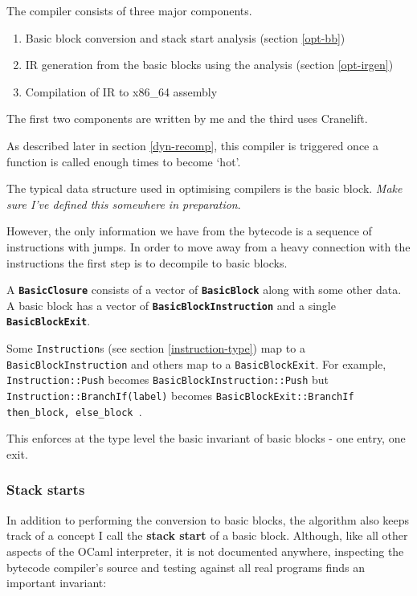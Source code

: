 The compiler consists of three major components.

\begin{enumerate}
      \item Basic block conversion and stack start analysis (section \ref{opt-bb})
      \item IR generation from the basic blocks using the analysis (section \ref{opt-irgen})
      \item Compilation of IR to x86\_64 assembly
\end{enumerate}

The first two components are written by me and the third uses Cranelift.

As described later in section \ref{dyn-recomp}, this compiler is triggered once a function is
called enough times to become `hot'.

\label{opt-bb}

The typical data structure used in optimising compilers is the basic block. \emph{Make sure I've
      defined this somewhere in preparation}.

However, the only information we have from the bytecode is a sequence of instructions with jumps.
In order to move away from a heavy connection with the instructions the first step is to decompile
to basic blocks.


A \textbf{\texttt{BasicClosure}} consists of a vector of \textbf{\texttt{BasicBlock}} along with
some other data. A basic block has a vector of \textbf{\texttt{BasicBlockInstruction}} and a single
\textbf{\texttt{BasicBlockExit}}.

Some \texttt{Instruction}s (see section \ref{instruction-type}) map to a
\texttt{BasicBlockInstruction} and others map to a \texttt{BasicBlockExit}. For example,
\texttt{Instruction::Push} becomes \texttt{BasicBlockInstruction::Push} but
\texttt{Instruction::BranchIf(label)} becomes \texttt{BasicBlockExit::BranchIf { then\_block,
else\_block }}.

This enforces at the type level the basic invariant of basic blocks - one entry, one exit.

\subsubsection{Stack starts}

In addition to performing the conversion to basic blocks, the algorithm also keeps track of a
concept I call the \textbf{stack start} of a basic block. Although, like all other aspects of the
OCaml interpreter, it is not documented anywhere, inspecting the bytecode compiler's source and
testing against all real programs finds an important invariant:

